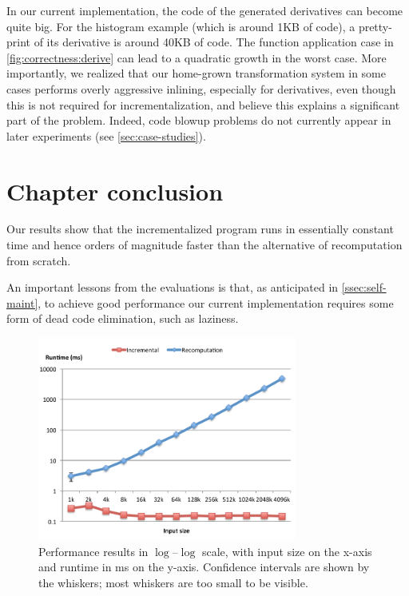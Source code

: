 In our current implementation, the code of the generated
derivatives can become quite big. For the histogram example
(which is around 1KB of code), a pretty-print of its derivative
is around 40KB of code. The function application case in
\cref{fig:correctness:derive} can lead to a quadratic growth in
the worst case. More importantly, we realized that our home-grown
transformation system in some cases performs overly aggressive
inlining, especially for derivatives, even though this is not
required for incrementalization, and believe this explains a
significant part of the problem. Indeed, code blowup problems do
not currently appear in later experiments (see
\cref{sec:case-studies}).

\section{Chapter conclusion}
Our results show that the incrementalized program runs
in essentially constant time and hence orders of magnitude faster than
the alternative of recomputation from scratch.

An important lessons from the evaluations is that,
as anticipated in \cref{ssec:self-maint}, to achieve good
performance our current implementation requires some form of dead
code elimination, such as laziness.

\begin{figure}
\includegraphics[keepaspectratio,width=8.5cm]{pldi14/HistogramGenerated-new.pdf}
\caption[Performance results in $\log$--$\log$ scale]
{Performance results in $\log$--$\log$ scale, with input size on
  the x-axis and runtime in ms on the y-axis. Confidence
  intervals are shown by the whiskers; most whiskers are
  too small to be visible.}
\label{fig:graph}
\end{figure}
